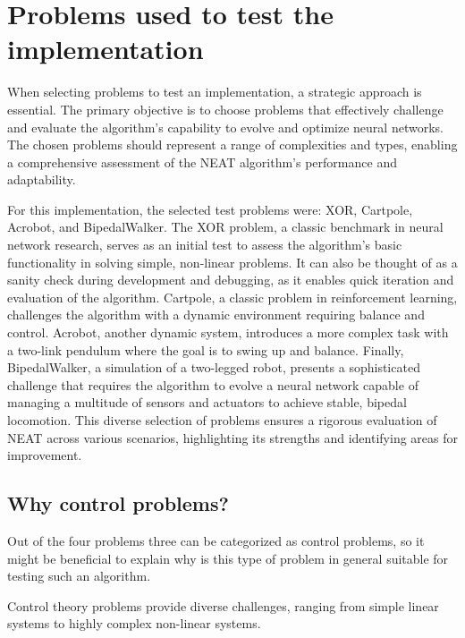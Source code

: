 \documentclass{article}
\begin{document}
    \section{Problems used to test the implementation}
    When selecting problems to test an implementation, a strategic approach is essential.
    The primary objective is to choose problems that effectively challenge and evaluate the algorithm's capability to evolve and optimize neural networks.
    The chosen problems should represent a range of complexities and types, enabling a comprehensive assessment of the NEAT
    algorithm's performance and adaptability.

    \par For this implementation, the selected test problems were: XOR, Cartpole, Acrobot, and BipedalWalker.
    The XOR problem, a classic benchmark in neural network research, serves as an initial
    test to assess the algorithm's basic functionality in solving simple, non-linear problems. It can also be thought
    of as a sanity check during development and debugging, as it enables quick iteration and evaluation of the algorithm.
    Cartpole, a classic problem in reinforcement learning, challenges the algorithm with a dynamic environment requiring balance and control.
    Acrobot, another dynamic system, introduces a more complex task with a two-link pendulum where the goal is to swing up and balance.
    Finally, BipedalWalker, a simulation of a two-legged robot, presents a sophisticated challenge that requires the algorithm to evolve a 
    neural network capable of managing a multitude of sensors and actuators to achieve stable, bipedal locomotion.
    This diverse selection of problems ensures a rigorous evaluation of NEAT across various scenarios,
    highlighting its strengths and identifying areas for improvement.

    \subsection{Why control problems?}
    Out of the four problems three can be categorized as control problems, so it might be beneficial to explain why is this type of problem in general
    suitable for testing such an algorithm. 

    Control theory problems provide diverse challenges, ranging from simple linear systems to highly
    complex non-linear systems.
\end{document}
